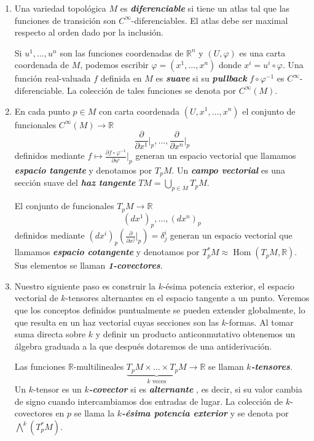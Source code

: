 \documentclass[spanish]{article}
\theoremstyle{definition}
\newcommand{\R}{\mathbb{R}}
\newcommand{\Cinf}{C^\infty}
\DeclareMathOperator{\sgn}{sgn}
\DeclareMathOperator{\Hom}{Hom}
\begin{document}
	\begin{enumerate}
		\item Una variedad topológica $M$ es \textbf{\textit{diferenciable}} si tiene un atlas tal que las funciones de transición son $\Cinf$-diferenciables. 
		El atlas debe ser maximal respecto al orden dado por la inclusión.
		
		Si $u^1,\ldots,u^n$ son las funciones coordenadas de $\R^n$ y $(U,\varphi)$ es una carta coordenada de $M$, podemos escribir $\varphi=(x^1,\ldots,x^n)$ donde  $x^i=u^i\circ\varphi$. Una función real-valuada $f$ definida en $M$ es \textbf{\textit{suave}} si su \textbf{\textit{pullback}} $f\circ\varphi^{-1}$ es $\Cinf$-diferenciable. La colección de tales funciones se denota por $\Cinf(M)$.
		
		\item En cada punto $p\in M$ con carta coordenada $(U,x^1,\ldots,x^n)$ el conjunto de funcionales $\Cinf(M)\to \R$
		\[\frac{\partial}{\partial x^1}\Big|_p,\ldots,\frac{\partial}{\partial x^n}\Big|_p\]
		definidos mediante $f\mapsto \frac{\partial f\circ\varphi^{-1}}{\partial u^i}\Big|_p$ generan un espacio vectorial que llamamos \textbf{\textit{espacio tangente}} y denotamos por $T_pM$. Un \textbf{\textit{campo vectorial}} es una sección suave del \textbf{\textit{haz tangente}} $TM=\bigcup_{p\in M}T_pM$.
		
		El conjunto de funcionales $T_pM\to \R$
		\[(dx^1)_p,\ldots,(dx^n)_p\]
		definidos mediante $(dx^i)_p\left(\frac{\partial}{\partial x^j}\Big|_p\right)=\delta_j^i$ generan un espacio vectorial que llamamos \textbf{\textit{espacio cotangente}} y denotamos por $T_p^*M\approx\Hom(T_pM,\R)$. Sus elementos se llaman \textbf{\textit{1-covectores}}.
		
		\item Nuestro siguiente paso es construir la $k$-ésima potencia exterior, el espacio vectorial de $k$-tensores alternantes en el espacio tangente a un punto. Veremos que los conceptos definidos puntualmente se pueden extender globalmente, lo que resulta en un haz vectorial cuyas secciones son las $k$-formas. Al tomar suma directa sobre $k$ y definir un producto anticonmutativo obtenemos un álgebra graduada a la que después dotaremos de una antiderivación.
		
		Las funciones $\R$-multilineales $\underbrace{T_pM\times\ldots\times T_pM}_{k\text{ veces}}\to \R$ se llaman \textbf{\textit{$k$-tensores}}. \\Un $k$-tensor es un \textbf{\textit{$k$-covector}} si es \textbf{\textit{alternante}}
		, es decir, si su valor cambia de signo cuando intercambiamos dos entradas de lugar. La colección de $k$-covectores en $p$ se llama la \textbf{\textit{$k$-ésima potencia exterior}} y se denota por $\bigwedge^k(T^*_pM)$.
		

\end{enumerate}
\end{document}
